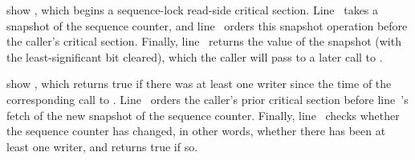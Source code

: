 \begin{fcvref}
 show , which begins a sequence-lock
read-side critical section.
Line~ takes a snapshot of the sequence counter, and
line~ orders
this snapshot operation before the caller's critical section.
Finally, line~ returns the value of the snapshot (with the least-significant
bit cleared), which the caller
will pass to a later call to .
\end{fcvref}

\QuickQuizEnd

\begin{fcvref}
 show , which returns true if there
was at least one writer since the time of the corresponding
call to .
Line~ orders the caller's prior critical section before line~'s
fetch of the new snapshot of the sequence counter.
Finally, line~ checks whether the sequence counter has changed,
in other words, whether there has been at least one writer, and returns
true if so.
\end{fcvref}


